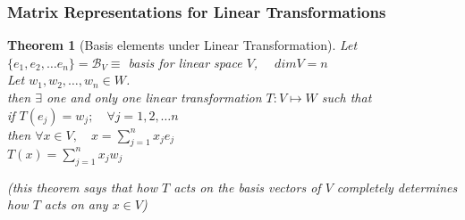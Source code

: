 \documentclass[twoside]{amsart}
\theoremstyle{plain}
\newtheorem{theorem}{Theorem}
\theoremstyle{definition}
\begin{document}


\subsubsection{ Matrix Representations for Linear Transformations }
\begin{theorem}[Basis elements under Linear Transformation]\label{T:Matrix_Representation}
Let $\{ e_1,e_2,\dots e_n  \} = \mathcal{B}_V \equiv$ basis for linear space $V$, $\quad dim V = n$ \\
Let $w_1,w_2,\dots,w_n \in W$.  \\
\phantom{Let} then $\exists$ one and only one linear transformation $T:V \mapsto W$ such that \\
if $T(e_j) = w_j; \quad \forall j = 1, 2, \dots n$ \\
\phantom{if} then $\forall x \in V, \quad x = \sum_{j=1}^n x_j e_j$ \\
\phantom{if then} $T(x) = \sum_{j=1}^n x_j w_j  $

(this theorem says that how $T$ acts on the basis vectors of $V$ completely determines how $T$ acts on any $x \in V$)
\end{theorem}
\end{document}
